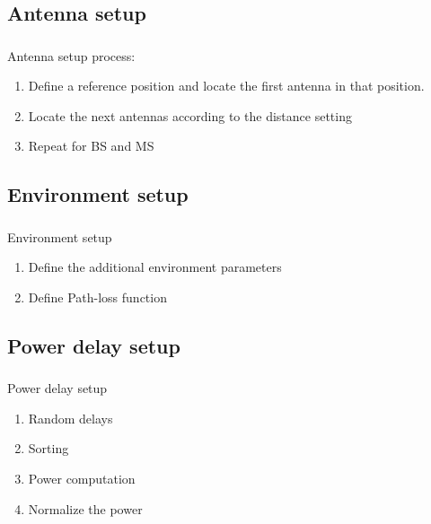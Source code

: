 \documentclass[10pt,aspectratio=169]{beamer}
\begin{document}
		\subsection{Antenna setup}
	\begin{frame}
		\frametitle{\insertsection}
		\framesubtitle{\insertsubsection}	 
        Antenna setup process:
\begin{enumerate}
\item Define a  reference position and locate the first antenna in that position. 
\item Locate the next antennas according to the distance setting
\item Repeat for BS and MS
\end{enumerate}

	\end{frame}
	\subsection{Environment setup}
	\begin{frame}
		\frametitle{\insertsection}
		\framesubtitle{\insertsubsection}	 
        Environment setup
\begin{enumerate}
\item Define the additional environment parameters
\item Define Path-loss function
\end{enumerate}

	\end{frame}
	\subsection{Power delay setup}
	\begin{frame}
		\frametitle{\insertsection}
		\framesubtitle{\insertsubsection}	 
        Power delay setup
\begin{enumerate}
\item Random delays
\item Sorting
\item Power computation
\item Normalize the power
\end{enumerate}

	\end{frame}
\end{document}

